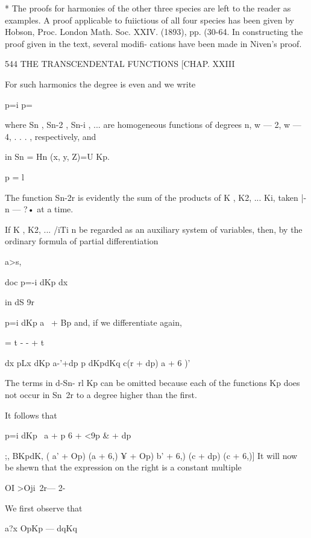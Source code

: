 {* The proofs for harmonies of the other three species are left to the
reader as examples. A proof applicable to fuiictious of all four
species has been given by Hobson, Proc. London Math. Soc. XXIV.
(1893), pp. (30-64. In constructing the proof given in the text,
several modifi- cations have been made in Niven's proof.



544 THE TRANSCENDENTAL FUNCTIONS [CHAP. XXIII

For such harmonics the degree is even and we write

p=i p=\

where Sn , Sn-2 , Sn-i , ... are homogeneous functions of degrees n, w
— 2, w — 4, . . . , respectively, and

in Sn = Hn (x, y, Z)=U Kp.

p = l

The function Sn-2r is evidently the sum of the products of K , K2, ...
Ki, taken |- n — ?• at a time.

If K , K2, ... /iTi n be regarded as an auxiliary system of variables,
then, by the ordinary formula of partial differentiation



a>s,






doc p=-i dKp dx

in dS 9r

p=i dKp a~ + Bp and, if we differentiate again,



= t - - + t



dx pLx dKp a-'+dp p dKpdKq c(r + dp) a + 6 )'

The terms in d-Sn- rl Kp can be omitted because each of the functions
Kp does not occur in Sn\ 2r to a degree higher than the first.

It follows that



p=i dKp \ a + p 6 + <9p \& + dp\






 ;, BKpdK, ( a' + Op) (a + 6,) ¥ + Op) b' + 6,) (c + dp) (c + 6,)] It
will now be shewn that the expression on the right is a constant
multiple

OI >Oji\ 2r— 2-

We first observe that



a?x OpKp — dqKq



}
